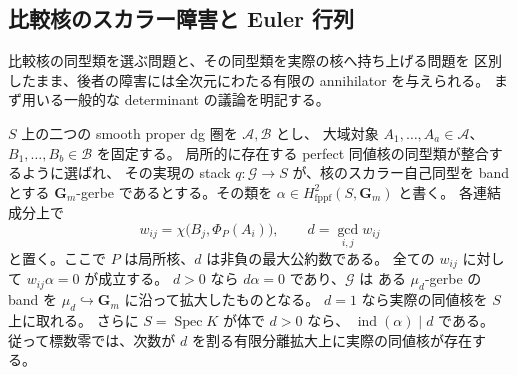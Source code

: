 \subsection{比較核のスカラー障害と Euler 行列}

比較核の同型類を選ぶ問題と、その同型類を実際の核へ持ち上げる問題を
区別したまま、後者の障害には全次元にわたる有限の annihilator を与えられる。
まず用いる一般的な determinant の議論を明記する。

\begin{lemma}
\label{lem:nfm-kernel-determinant-annihilator}
$S$ 上の二つの smooth proper dg 圏を $\mathcal A,\mathcal B$ とし、
大域対象 $A_1,\ldots,A_a\in\mathcal A$、
$B_1,\ldots,B_b\in\mathcal B$ を固定する。
局所的に存在する perfect 同値核の同型類が整合するように選ばれ、
その実現の stack
$q:\mathcal G\to S$ が、核のスカラー自己同型を band とする
$\mathbf G_m$-gerbe であるとする。その類を
$\alpha\in H^2_{\mathrm{fppf}}(S,\mathbf G_m)$ と書く。
各連結成分上で
\[
 w_{ij}=\chi\bigl(B_j,\Phi_P(A_i)\bigr),\qquad
 d=\gcd_{i,j}w_{ij}
\]
と置く。ここで $P$ は局所核、$d$ は非負の最大公約数である。
全ての $w_{ij}$ に対して $w_{ij}\alpha=0$ が成立する。
$d>0$ なら $d\alpha=0$ であり、$\mathcal G$ は
ある $\mu_d$-gerbe の band を
$\mu_d\hookrightarrow\mathbf G_m$ に沿って拡大したものとなる。
$d=1$ なら実際の同値核を $S$ 上に取れる。
さらに $S=\operatorname{Spec}K$ が体で $d>0$ なら、
$\operatorname{ind}(\alpha)\mid d$ である。
従って標数零では、次数が $d$ を割る有限分離拡大上に実際の同値核が存在する。
\end{lemma}


